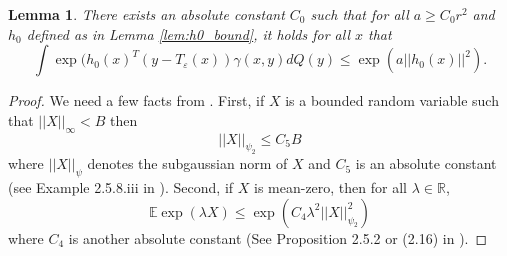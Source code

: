 \documentclass{article}
\newtheorem{lemma}{Lemma}
\theoremstyle{definition}
\newcommand{\Teps}{T_\varepsilon}
\begin{document}
\begin{lemma} \label{lem:a_bound}
    There exists an absolute constant $C_0$ such that for all $a \geq C_0r^2$ and $h_0$ defined as in Lemma \ref{lem:h0_bound}, it holds for all $x$ that
    \begin{equation*}
        \int \exp(h_0(x)^T(y - \Teps(x)) \gamma(x,y) dQ(y) \leq \exp(a||h_0(x)||^2).
    \end{equation*}
\end{lemma}

\begin{proof}
    We need a few facts from \cite{vershynin2018high}. First, if $X$ is a bounded random variable such that $||X||_\infty < B$ then 
    \begin{equation*}
        ||X||_{\psi_2} \leq C_5 B
    \end{equation*}
    where $||X||_{\psi}$ denotes the subgaussian norm of $X$ and $C_5$ is an absolute constant (see Example 2.5.8.iii in \cite{vershynin2018high}). Second, if $X$ is mean-zero, then for all $\lambda \in \mathbb{R}$,
    \begin{equation}
        \mathbb{E}\exp(\lambda X) \leq \exp(C_4\lambda^2||X||_{\psi_2}^2) \label{eq:hoeffding_type}
    \end{equation}
    where $C_4$ is another absolute constant
    (See Proposition 2.5.2 or (2.16) in \cite{vershynin2018high}). 
    

\end{proof}
\end{document}
